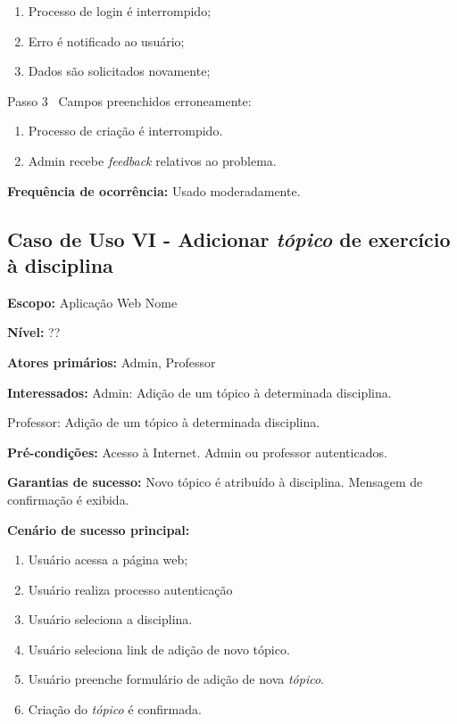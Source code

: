 \documentclass[12pt,oneside,a4paper,article]{abntex2}
\begin{document}
		\begin{enumerate}[label=\alph*.]	
			\item Processo de login é interrompido;
			\item Erro é notificado ao usuário;
			\item Dados são solicitados novamente;
		\end{enumerate}
		
		Passo 3 \textrightarrow \ Campos preenchidos erroneamente:
		
		\begin{enumerate}[label=\alph*.]	
			\item Processo de criação é interrompido.
			\item Admin recebe \textit{feedback} relativos ao problema.	
		\end{enumerate}
		
		
		\textbf{Frequência de ocorrência:} Usado moderadamente.
	
		\subsection{Caso de Uso VI - Adicionar \textit{tópico} de exercício à disciplina}
		
		\textbf{Escopo:} Aplicação Web Nome
		
		\textbf{Nível:} ??
		
		\textbf{Atores primários:} Admin, Professor
		
		\textbf{Interessados:} Admin: Adição de um tópico à determinada disciplina.
		
		Professor: Adição de um tópico à determinada disciplina.
		
		\textbf{Pré-condições:} Acesso à Internet. Admin ou professor autenticados.
		
		\textbf{Garantias de sucesso:} Novo tópico é atribuído à disciplina. Mensagem de confirmação é exibida.
		
		\textbf{Cenário de sucesso principal:} 
		
		\begin{enumerate}
			\item Usuário acessa a página web;
			
			\item Usuário realiza processo autenticação
			
			\item Usuário seleciona a disciplina.
			
			\item Usuário seleciona link de adição de novo tópico.
			
			\item Usuário preenche formulário de adição de nova \textit{tópico}.
			
			\item Criação do \textit{tópico} é confirmada.
			
		\end{enumerate}
		
\end{document}
